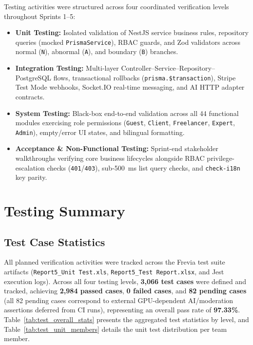 Testing activities were structured across four coordinated verification levels throughout Sprints 1--5:
\begin{itemize}[leftmargin=1.0cm, itemsep=3pt]
    \item \textbf{Unit Testing:} Isolated validation of NestJS service business rules, repository queries (mocked \texttt{PrismaService}), RBAC guards, and Zod validators across normal (\texttt{N}), abnormal (\texttt{A}), and boundary (\texttt{B}) branches.
    \item \textbf{Integration Testing:} Multi-layer Controller--Service--Repository--PostgreSQL flows, transactional rollbacks (\texttt{prisma.\$transaction}), Stripe Test Mode webhooks, Socket.IO real-time messaging, and AI HTTP adapter contracts.
    \item \textbf{System Testing:} Black-box end-to-end validation across all 44 functional modules exercising role permissions (\texttt{Guest}, \texttt{Client}, \texttt{Freelancer}, \texttt{Expert}, \texttt{Admin}), empty/error UI states, and bilingual formatting.
    \item \textbf{Acceptance \& Non-Functional Testing:} Sprint-end stakeholder walkthroughs verifying core business lifecycles alongside RBAC privilege-escalation checks (\texttt{401}/\texttt{403}), sub-500~ms list query checks, and \texttt{check-i18n} key parity.
\end{itemize}

\section{Testing Summary}

\subsection{Test Case Statistics}

All planned verification activities were tracked across the Frevia test suite artifacts (\texttt{Report5\_Unit Test.xls}, \texttt{Report5\_Test Report.xlsx}, and Jest execution logs). Across all four testing levels, \textbf{3,066 test cases} were defined and tracked, achieving \textbf{2,984 passed cases}, \textbf{0 failed cases}, and \textbf{82 pending cases} (all 82 pending cases correspond to external GPU-dependent AI/moderation assertions deferred from CI runs), representing an overall pass rate of \textbf{97.33\%}. Table~\ref{tab:test_overall_stats} presents the aggregated test statistics by level, and Table~\ref{tab:test_unit_members} details the unit test distribution per team member.

